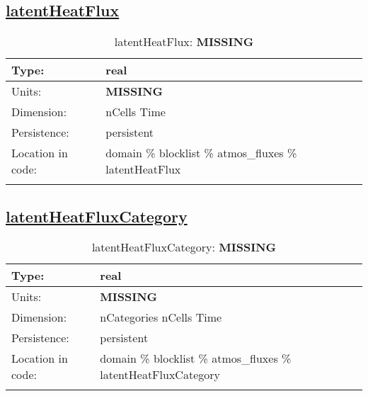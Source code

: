 \subsection[latentHeatFlux]{\hyperref[sec:var_tab_atmos_fluxes]{latentHeatFlux}}
\label{subsec:var_sec_atmos_fluxes_latentHeatFlux}
\begin{center}
\begin{longtable}{| p{2.0in} | p{4.0in} |}
        \hline 
        Type: & real \\
        \hline 
        Units: & {\bf \color{red} MISSING} \\
        \hline 
        Dimension: & nCells Time \\
        \hline 
        Persistence: & persistent \\
        \hline 
         Location in code: & domain \% blocklist \% atmos\_fluxes \% latentHeatFlux \\
         \hline 
    \caption{latentHeatFlux: {\bf \color{red} MISSING}}
\end{longtable}
\end{center}
\subsection[latentHeatFluxCategory]{\hyperref[sec:var_tab_atmos_fluxes]{latentHeatFluxCategory}}
\label{subsec:var_sec_atmos_fluxes_latentHeatFluxCategory}
\begin{center}
\begin{longtable}{| p{2.0in} | p{4.0in} |}
        \hline 
        Type: & real \\
        \hline 
        Units: & {\bf \color{red} MISSING} \\
        \hline 
        Dimension: & nCategories nCells Time \\
        \hline 
        Persistence: & persistent \\
        \hline 
         Location in code: & domain \% blocklist \% atmos\_fluxes \% latentHeatFluxCategory \\
         \hline 
    \caption{latentHeatFluxCategory: {\bf \color{red} MISSING}}
\end{longtable}
\end{center}
